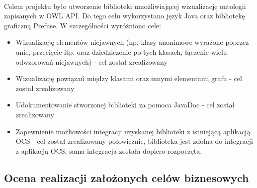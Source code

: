 \documentclass[a4paper,10pt]{article}
\begin{document}
\paragraph{} Celem projektu było utworzenie biblioteki umożliwiającej wizualizację ontologii zapisanych w OWL API. Do tego celu wykorzystano język Java oraz bibliotekę graficzną Prefuse.  W szczególności wyróżniono cele:
\begin{itemize}
 \item Wizualizację elementów niejawnych (np. klasy anonimowe wyrażone
poprzez unie, przecięcie itp. oraz dziedziczenie po tych klasach,
łączenie wielu odwzorowań niejawnych)  -  cel został zrealizowany 
\item  Wizualizację powiązań między klasami oraz innymi elementami grafu - cel został zrealizowany 
\item  Udokumentowanie stworzonej biblioteki za pomoca JavaDoc - cel został zrealizowany
\item  Zapewnienie możliowości integracji uzyskanej biblioteki z istniejącą aplikacją OCS - cel został zrealizowany połowicznie, biblioteka jest zdolna do integracji z aplikacją OCS, sama integracja została dopiero rozpoczęta.
\end{itemize}


\subsection{ Ocena realizacji założonych celów biznesowych}
\end{document}
